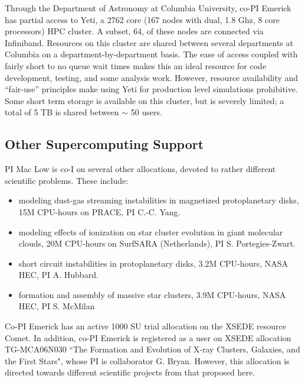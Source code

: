 \documentclass[11pt]{article}
\begin{document}
Through the Department of Astronomy at Columbia University, co-PI Emerick has partial access to Yeti, a 2762 core (167 nodes with dual, 1.8 Ghz, 8 core processors) HPC cluster. A subset, 64, of these nodes are connected via Infiniband. Resources on this cluster are shared between several departments at Columbia on a department-by-department basis. The ease of access coupled with fairly short to no queue wait times makes this an ideal resource for code development, testing, and some analysis work. However, resource availability and ``fair-use'' principles make using Yeti for production level simulations prohibitive. Some short term storage is available on this cluster, but is severely limited; a total of 5 TB is shared between $\sim$ 50 users.


\subsection{Other Supercomputing Support}
 
PI Mac Low is co-I on several other allocations, devoted to rather different scientific problems.  These include:
\begin{itemize}
\item modeling dust-gas streaming instabilities in magnetized protoplanetary disks, 15M CPU-hours on PRACE, PI C.-C. Yang.
\item modeling effects of ionization on star cluster evolution in giant molecular clouds, 20M CPU-hours on SurfSARA (Netherlands), PI S. Portegies-Zwart.
\item short circuit instabilities in protoplanetary disks, 3.2M CPU-hours, NASA HEC, PI A. Hubbard.
\item formation and assembly of massive star clusters, 3.9M CPU-hours, NASA HEC, PI S. McMilan
\end{itemize}

\noindent Co-PI Emerick has an active 1000 SU trial allocation on the XSEDE resource Comet. In addition, co-PI Emerick is registered as a user on XSEDE allocation TG-MCA06N030 ``The Formation and Evolution of X-ray Clusters, Galaxies, and the First Stars", whose PI is collaborator G. Bryan. However, this allocation is directed towards different scientific projects from that proposed here.
\clearpage
\appendix
\end{document}
